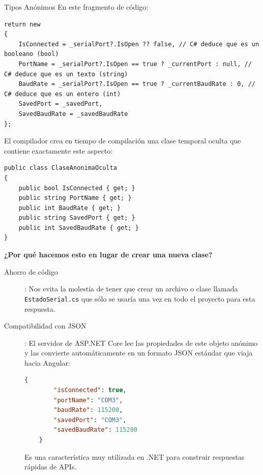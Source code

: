 \documentclass[
10pt, %
a4paper, %
oneside, %
headinclude,footinclude, %
BCOR5mm, %
]{scrartcl}
\begin{document}
\begin{InfoBox}{Tipos Anónimos} 
En este fragmento de código:

\begin{lstlisting}[style=VSCodeDark]
return new
{
	IsConnected = _serialPort?.IsOpen ?? false, // C# deduce que es un booleano (bool)
	PortName = _serialPort?.IsOpen == true ? _currentPort : null, // C# deduce que es un texto (string)
	BaudRate = _serialPort?.IsOpen == true ? _currentBaudRate : 0, // C# deduce que es un entero (int)
	SavedPort = _savedPort,
	SavedBaudRate = _savedBaudRate
};
\end{lstlisting}
El compilador crea en tiempo de compilación una clase temporal oculta que contiene exactamente este aspecto:

\begin{lstlisting}[style=VSCodeDark]
public class ClaseAnonimaOculta
{
	public bool IsConnected { get; }
	public string PortName { get; }
	public int BaudRate { get; }
	public string SavedPort { get; }
	public int SavedBaudRate { get; }
}
\end{lstlisting}
\end{InfoBox}

\textbf{\large ¿Por qué hacemos esto en lugar de crear una nueva clase?}
\begin{description}
	\item[Ahorro de código]: Nos evita la molestia de tener que crear un archivo o clase llamada \texttt{EstadoSerial.cs} que sólo se usaría una vez en todo el proyecto para esta respuesta.
	\item[Compatibilidad con JSON]: El servidor de ASP.NET Core lee las propiedades de este objeto anónimo y las convierte automáticamente en un formato JSON estándar que viaja hacia Angular:
	\begin{lstlisting}[language=json]
	{
		"isConnected": true,
		"portName": "COM3",
		"baudRate": 115200,
		"savedPort": "COM3",
		"savedBaudRate": 115200
	}
	\end{lstlisting}
	Es una característica muy utilizada en .NET para construir respuestas rápidas de APIs.
\end{description}

\newpage
\end{document}
